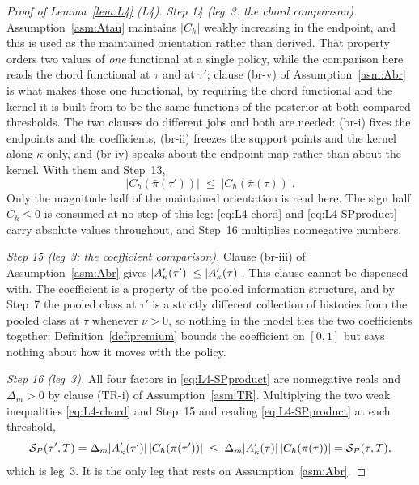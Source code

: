 \begin{proof}[Proof of Lemma~\ref{lem:L4} (L4)]
\emph{Step 14 (leg~3: the chord comparison).} Assumption~\ref{asm:Atau} maintains
$\lvert C_h\rvert$ weakly increasing in the endpoint, and this is used as the maintained orientation
rather than derived. That property orders two values of \emph{one} functional at a single policy,
while the comparison here reads the chord functional at $\tau$ and at $\tau'$; clause (br-v) of
Assumption~\ref{asm:Abr} is what makes those one functional, by requiring the chord functional and
the kernel it is built from to be the same functions of the posterior at both compared thresholds.
The two clauses do different jobs and both are needed: (br-i) fixes the endpoints and the
coefficients, (br-ii) freezes the support points and the kernel along $\kappa$ only, and (br-iv)
speaks about the endpoint map rather than about the kernel. With them and Step~13,
\begin{equation}
\label{eq:L4-chord}
\lvert C_h(\bar\pi(\tau'))\rvert \;\le\; \lvert C_h(\bar\pi(\tau))\rvert .
\end{equation}
Only the magnitude half of the maintained orientation is read here. The sign half $C_h \le 0$ is
consumed at no step of this leg: \eqref{eq:L4-chord} and \eqref{eq:L4-SPproduct} carry absolute
values throughout, and Step~16 multiplies nonnegative numbers.

\emph{Step 15 (leg~3: the coefficient comparison).} Clause (br-iii) of Assumption~\ref{asm:Abr} gives
$\lvert A'_{\kappa}(\tau')\rvert \le \lvert A'_{\kappa}(\tau)\rvert$. This clause cannot be dispensed with. The
coefficient is a property of the pooled information structure, and by Step~7 the pooled class at
$\tau'$ is a strictly different collection of histories from the pooled class at $\tau$ whenever
$\nu > 0$, so nothing in the model ties the two coefficients together; Definition~\ref{def:premium}
bounds the coefficient on $[0,1]$ but says nothing about how it moves with the policy.

\emph{Step 16 (leg~3).} All four factors in \eqref{eq:L4-SPproduct} are nonnegative reals and
$\Delta_m > 0$ by clause (TR-i) of Assumption~\ref{asm:TR}. Multiplying the two weak inequalities
\eqref{eq:L4-chord} and Step~15 and reading \eqref{eq:L4-SPproduct} at each threshold,
\begin{equation}
\label{eq:L4-leg3}
\mathcal S_P(\tau',T)
 = \Delta_m\lvert A'_{\kappa}(\tau')\rvert\,\lvert C_h(\bar\pi(\tau'))\rvert
 \;\le\; \Delta_m\lvert A'_{\kappa}(\tau)\rvert\,\lvert C_h(\bar\pi(\tau))\rvert
 = \mathcal S_P(\tau,T),
\end{equation}
which is leg~3. It is the only leg that rests on Assumption~\ref{asm:Abr}.


\end{proof}
